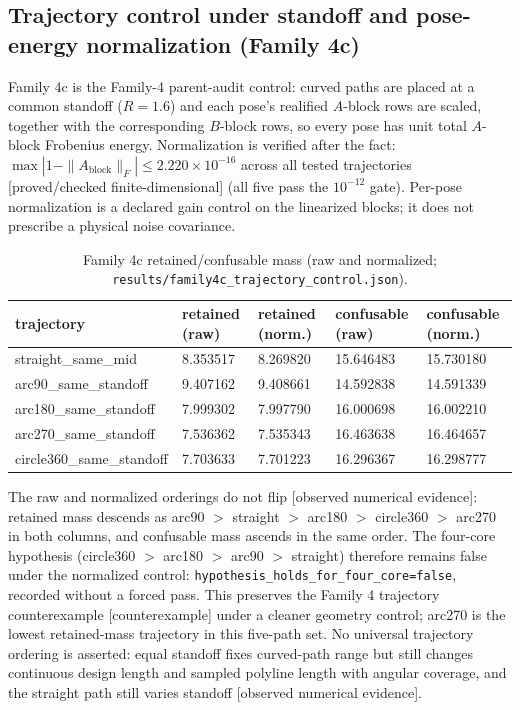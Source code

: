 \documentclass[12pt]{article}
\newcommand{\FDL}{\textnormal{[proved/checked finite-dimensional]}}
\newcommand{\OBS}{\textnormal{[observed numerical evidence]}}
\newcommand{\CTX}{\textnormal{[counterexample]}}
\begin{document}
\subsection{Trajectory control under standoff and pose-energy normalization (Family 4c)}\label{sec:family4c}

Family 4c is the Family-4 parent-audit control: curved paths are placed at a
common standoff ($R=1.6$) and each pose's realified $A$-block rows are scaled,
together with the corresponding $B$-block rows, so every pose has unit total
$A$-block Frobenius energy. Normalization is verified after the fact:
$\max|1-\|A_{\mathrm{block}}\|_F|\le2.220\times10^{-16}$ across all tested
trajectories \FDL{} (all five pass the $10^{-12}$ gate). Per-pose
normalization is a declared gain control on the linearized blocks; it does
not prescribe a physical noise covariance.

\begin{table}[htbp]
\centering
\small
\caption{Family 4c retained/confusable mass (raw and normalized;
\texttt{results/family4c\_trajectory\_control.json}).}
\label{tab:f4c}
\begin{tabular}{l l l l l}
\toprule
trajectory & retained (raw) & retained (norm.) &
confusable (raw) & confusable (norm.) \\
\midrule
straight\_same\_mid & 8.353517 & 8.269820 & 15.646483 & 15.730180 \\
arc90\_same\_standoff & 9.407162 & 9.408661 & 14.592838 & 14.591339 \\
arc180\_same\_standoff & 7.999302 & 7.997790 & 16.000698 & 16.002210 \\
arc270\_same\_standoff & 7.536362 & 7.535343 & 16.463638 & 16.464657 \\
circle360\_same\_standoff & 7.703633 & 7.701223 & 16.296367 & 16.298777 \\
\bottomrule
\end{tabular}
\end{table}

The raw and normalized orderings do not flip \OBS{}: retained mass descends as
arc90 $>$ straight $>$ arc180 $>$ circle360 $>$ arc270 in both columns, and
confusable mass ascends in the same order. The four-core hypothesis
(circle360 $>$ arc180 $>$ arc90 $>$ straight) therefore remains false under
the normalized control: \texttt{hypothesis\_holds\_for\_four\_core=false},
recorded without a forced pass. This preserves the Family 4 trajectory
counterexample \CTX{} under a cleaner geometry control; arc270 is the lowest
retained-mass trajectory in this five-path set. No universal trajectory
ordering is asserted: equal standoff fixes curved-path range but still changes
continuous design length and sampled polyline length with angular coverage,
and the straight path still varies standoff \OBS{}.
\end{document}
